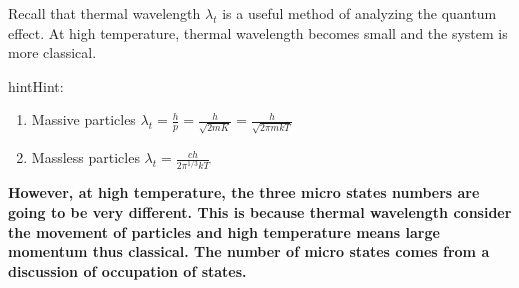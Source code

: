 \documentclass[letterpaper,10pt,english]{sphinxmanual}
\begin{document}
Recall that thermal wavelength $\lambda_t$ is a useful method of analyzing the quantum effect. At high temperature, thermal wavelength becomes small and the system is more classical.

\begin{notice}{hint}{Hint:}\begin{enumerate}
\item {} 
Massive particles $\lambda_t = \frac{h}{p} = \frac{h}{\sqrt{2m K}} = \frac{h}{\sqrt{ 2\pi m k T }}$

\item {} 
Massless particles $\lambda_t = \frac{c h}{2\pi^{1/3} k T}$

\end{enumerate}
\end{notice}

\textbf{However, at high temperature, the three micro states numbers are going to be very different. This is because thermal wavelength consider the movement of particles and high temperature means large momentum thus classical. The number of micro states comes from a discussion of occupation of states.}
\end{document}
